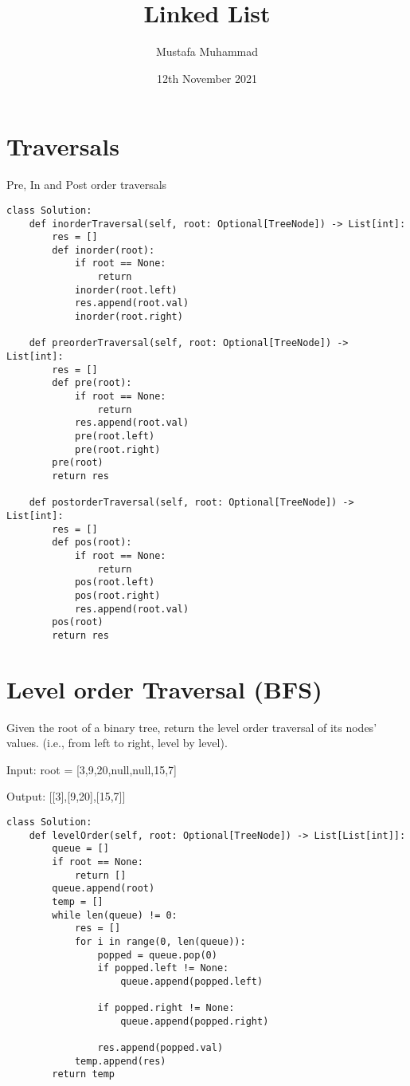 \documentclass[24pt, a4]{article}
\title{Linked List}
\author{Mustafa Muhammad}
\date{12th November 2021}
\begin{document}
\maketitle

\section{Traversals}

Pre, In and Post order traversals

\begin{lstlisting}
class Solution:
    def inorderTraversal(self, root: Optional[TreeNode]) -> List[int]:
        res = []
        def inorder(root):
            if root == None:
                return
            inorder(root.left)
            res.append(root.val)
            inorder(root.right)

    def preorderTraversal(self, root: Optional[TreeNode]) -> List[int]:
        res = []
        def pre(root):
            if root == None:
                return 
            res.append(root.val)
            pre(root.left)
            pre(root.right)
        pre(root)
        return res

    def postorderTraversal(self, root: Optional[TreeNode]) -> List[int]:
        res = []
        def pos(root):
            if root == None:
                return 
            pos(root.left)
            pos(root.right)
            res.append(root.val)
        pos(root)
        return res
\end{lstlisting}
\section{Level order Traversal (BFS)}
Given the root of a binary tree, return the level order traversal of its nodes' values. (i.e., from left to right, level by level).

Input: root = [3,9,20,null,null,15,7]

Output: [[3],[9,20],[15,7]]
\begin{lstlisting}
class Solution:
    def levelOrder(self, root: Optional[TreeNode]) -> List[List[int]]:
        queue = []
        if root == None:
            return []
        queue.append(root)
        temp = []
        while len(queue) != 0:
            res = []
            for i in range(0, len(queue)):
                popped = queue.pop(0)
                if popped.left != None:
                    queue.append(popped.left)
                
                if popped.right != None:
                    queue.append(popped.right)
                
                res.append(popped.val)
            temp.append(res)
        return temp
\end{lstlisting}
\end{document}
